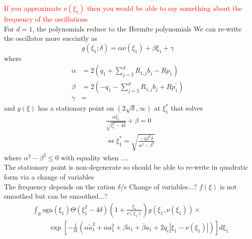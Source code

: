 \textcolor{red}{If you approximate $\nu(\xi_1)$ then you would be able 
to say something about the frequency of the oscillations}
\\
For $d = 1$, the polynomials reduce to the Hermite polynomials 
We can re-write the oscillator more succintly as 
\[ 
  g(\xi_1; \delta) = \alpha \nu(\xi_1) + \beta \xi_1 + \gamma 
\]
where 
\begin{equation}
  \begin{split}
    \alpha &= 2( q_1 + \sum_{j=2}^d R_{1,j}b_j - Rp_1 )  
  \\
  \beta &= 2(- q_1 - \sum_{j=2}^d R_{1,j}b_j + Rp_1^\prime)
  \\
  \gamma &=  
\end{split}
\end{equation}
and $g(\xi)$ has a stationary point on $(2\sqrt{\delta}, \infty)$ at $\xi_1^*$
that solves
\begin{equation}
  \begin{split}
    &\frac{\alpha \xi_1}{\sqrt{\xi_1^2 - 4\delta}}
    + \beta = 0 
    \\
    &
    \Leftrightarrow
    \xi_1^* = \sqrt{\frac{-4\beta^2 \delta}{\alpha^2 - \beta^2}}
  \end{split}
\end{equation}
where $\alpha^2 - \beta^2 \leq 0$ with equality when ....
\\
The stationary point is non-degenerate so should be able to 
re-write in quadratic form via a change of variables
\\
The frequency depends on the ration $\delta/\epsilon$
Change of variables...?
$f(\xi)$ is not smoothed but can be smoothed...?
\begin{equation}
  \begin{split}
    &\int_{\mathbb{R}} \text{sgn}(\xi_1) 
    \Theta(\xi_1^2 - 4\delta)\left( 1 + \frac{\xi_1}{\nu(\xi_1)} \right)
    g(\xi_1, \nu(\xi_1))
    \times 
    \\
    &
    \hspace{1cm}
    \exp{\left[-\frac{1}{2\epsilon} 
        \left( \alpha \tilde{a}_1^2 + \overline{\alpha} a_1^2
        + \beta \tilde{a}_1 + \overline{\beta} a_1 + 2q_c|\xi_1 - \nu(\xi_1)|
      \right) 
    \right]}  d \xi_1
  \end{split}
\end{equation}

